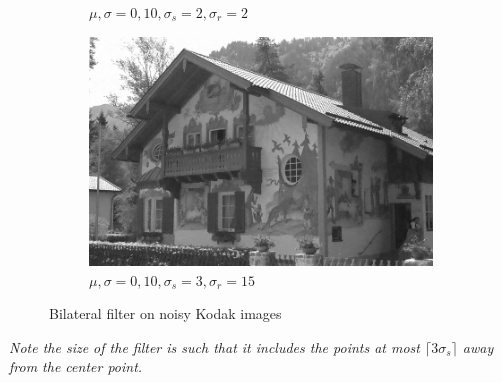\documentclass[a4paper, landscape]{article}
\begin{document}
\begin{figure}
\begin{subfigure}{0.33\linewidth}
        \caption{$\mu, \sigma = 0, 10, \sigma_s=2, \sigma_r=2$}
    \end{subfigure}
    \begin{subfigure}{0.33\linewidth}
        \centering
        \includegraphics[width=\linewidth]{kodak24,σ_noise10,σ_spatial3,σ_range15.png}
        \caption{$\mu, \sigma = 0, 10, \sigma_s=3, \sigma_r=15$}
    \end{subfigure}
    \caption{Bilateral filter on noisy Kodak images}
    \label{fig:kn}
\end{figure}

{\it Note the size of the filter is such that it includes the points at most ${\lceil3\sigma_s\rceil}$ away from the center point.
}
\end{document}
